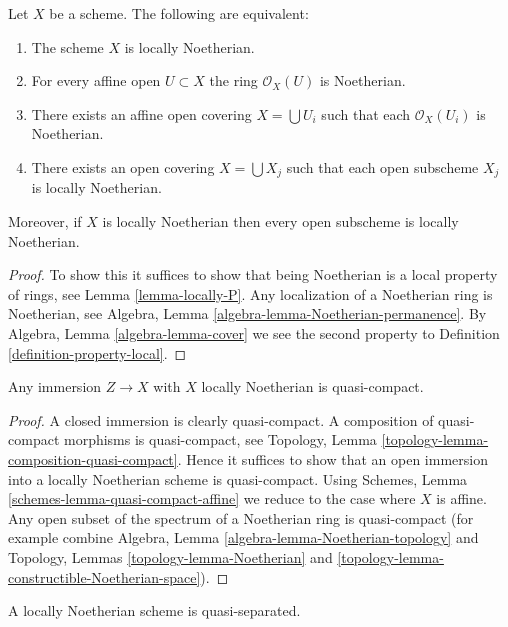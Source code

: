 \begin{lemma}
\label{lemma-locally-Noetherian}
Let $X$ be a scheme. The following are equivalent:
\begin{enumerate}
\item The scheme $X$ is locally Noetherian.
\item For every affine open $U \subset X$ the ring $\mathcal{O}_X(U)$
is Noetherian.
\item There exists an affine open covering $X = \bigcup U_i$ such that
each $\mathcal{O}_X(U_i)$ is Noetherian.
\item There exists an open covering $X = \bigcup X_j$
such that each open subscheme $X_j$ is locally Noetherian.
\end{enumerate}
Moreover, if $X$ is locally Noetherian then every open subscheme
is locally Noetherian.
\end{lemma}

\begin{proof}
To show this it suffices to show that being Noetherian is a local
property of rings, see Lemma \ref{lemma-locally-P}.
Any localization of a Noetherian ring is Noetherian, see
Algebra, Lemma \ref{algebra-lemma-Noetherian-permanence}.
By Algebra, Lemma \ref{algebra-lemma-cover} we see the second
property to Definition \ref{definition-property-local}.
\end{proof}

\begin{lemma}
\label{lemma-immersion-into-noetherian}
Any immersion $Z \to X$ with $X$ locally Noetherian is quasi-compact.
\end{lemma}

\begin{proof}
A closed immersion is clearly quasi-compact.
A composition of quasi-compact morphisms is quasi-compact,
see Topology, Lemma \ref{topology-lemma-composition-quasi-compact}.
Hence it suffices to show that an open immersion into
a locally Noetherian scheme is quasi-compact.
Using Schemes, Lemma \ref{schemes-lemma-quasi-compact-affine}
we reduce to the case where $X$ is affine.
Any open subset of the spectrum of a Noetherian ring
is quasi-compact (for example
combine Algebra, Lemma \ref{algebra-lemma-Noetherian-topology} and
Topology, Lemmas \ref{topology-lemma-Noetherian} and
\ref{topology-lemma-constructible-Noetherian-space}).
\end{proof}

\begin{lemma}
\label{lemma-locally-Noetherian-quasi-separated}
A locally Noetherian scheme is quasi-separated.
\end{lemma}

